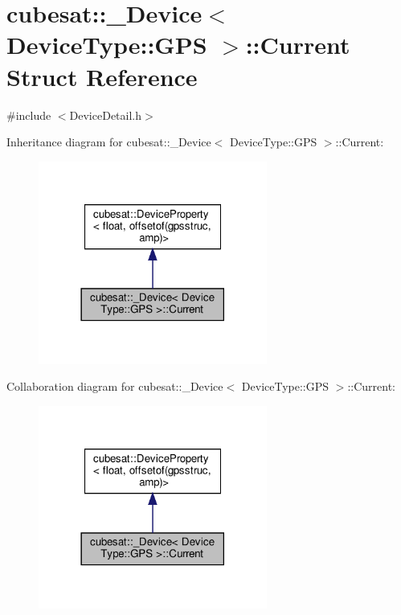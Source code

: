 \hypertarget{structcubesat_1_1__Device_3_01DeviceType_1_1GPS_01_4_1_1Current}{}\section{cubesat\+:\+:\+\_\+\+Device$<$ Device\+Type\+:\+:G\+PS $>$\+:\+:Current Struct Reference}
\label{structcubesat_1_1__Device_3_01DeviceType_1_1GPS_01_4_1_1Current}


{\ttfamily \#include $<$Device\+Detail.\+h$>$}



Inheritance diagram for cubesat\+:\+:\+\_\+\+Device$<$ Device\+Type\+:\+:G\+PS $>$\+:\+:Current\+:\nopagebreak
\begin{figure}[H]
\begin{center}
\leavevmode
\includegraphics[width=213pt]{structcubesat_1_1__Device_3_01DeviceType_1_1GPS_01_4_1_1Current__inherit__graph}
\end{center}
\end{figure}


Collaboration diagram for cubesat\+:\+:\+\_\+\+Device$<$ Device\+Type\+:\+:G\+PS $>$\+:\+:Current\+:\nopagebreak
\begin{figure}[H]
\begin{center}
\leavevmode
\includegraphics[width=213pt]{structcubesat_1_1__Device_3_01DeviceType_1_1GPS_01_4_1_1Current__coll__graph}
\end{center}
\end{figure}
